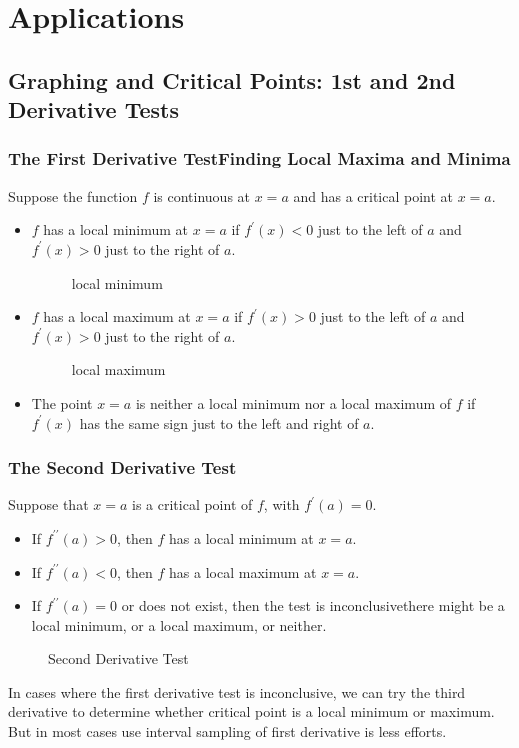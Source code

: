 \chapter{Applications}
\section{Graphing and Critical Points: 1st and 2nd Derivative Tests}
\subsection{The First Derivative Test\textemdash Finding Local Maxima and Minima}
Suppose the function $f$ is continuous at $x=a$ and has a critical point at $x=a$.
\begin{itemize}
\item $f$ has a local minimum at $x=a$ if $f^\prime(x)<0$ just to the left of $a$ and $f^\prime(x)>0$ just to the right of $a$.
  \begin{figure}[H]
    \centering
    \caption{local minimum}
  \end{figure}
\item $f$ has a local maximum at $x=a$ if $f^\prime (x)>0$ just to the left of $a$ and $f^\prime (x)>0$ just to the right of $a$.
  \begin{figure}[H]
    \centering
    \caption{local maximum}
  \end{figure}
\item The point $x=a$ is neither a local minimum nor a local maximum of $f$ if $f^\prime (x)$ has the same sign just to the left and right of $a$.
\end{itemize}

\subsection{The Second Derivative Test}
Suppose that $x=a$ is a critical point of $f$, with $f^\prime(a)=0$.
\begin{itemize}
\item If $f^{\prime\prime}(a)>0$, then $f$ has a local minimum at $x=a$.
\item If $f^{\prime\prime}(a)<0$, then $f$ has a local maximum at $x=a$.
\item If $f^{\prime\prime}(a)=0$ or does not exist, then the test is inconclusive\textemdash there might be a local minimum, or a local maximum, or neither.
\end{itemize}
\begin{figure}[H]
  \centering
  \caption{Second Derivative Test}
\end{figure}
\begin{note}
  In cases where the first derivative test is inconclusive, we can try the third derivative to determine whether critical point is a local minimum or maximum. But in most cases use interval sampling of first derivative is less efforts.
\end{note}
